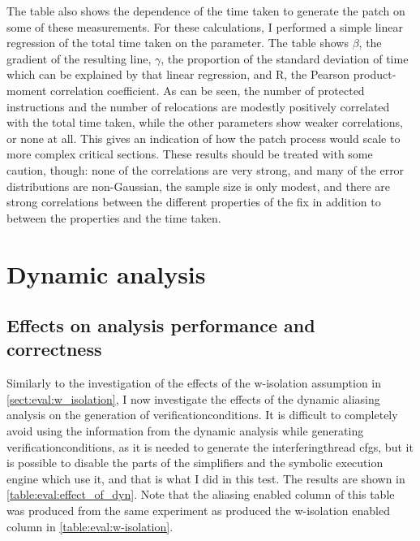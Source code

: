 The table also shows the dependence of the time taken to generate the
patch on some of these measurements.  For these calculations, I
performed a simple linear regression of the total time taken on the
parameter.  The table shows $\beta$, the gradient of the resulting
line, $\gamma$, the proportion of the standard deviation of time which
can be explained by that linear regression, and R, the Pearson
product-moment correlation coefficient.  As can be seen, the number of
protected instructions and the number of relocations are modestly
positively correlated with the total time taken, while the other
parameters show weaker correlations, or none at all.  This gives an
indication of how the patch process would scale to more complex
critical sections.  These results should be treated with some caution,
though: none of the correlations are very strong, and many of the
error distributions are non-Gaussian, the sample size is only modest,
and there are strong correlations between the different properties of
the fix in addition to between the properties and the time taken.

\section{Dynamic analysis}
\label{sect:eval:dynamic_analysis}

\subsection{Effects on analysis performance and correctness}


Similarly to the investigation of the effects of the \gls{w-isolation}
assumption in \autoref{sect:eval:w_isolation}, I now investigate the
effects of the dynamic aliasing analysis on the generation of
\glspl{verificationcondition}.  It is difficult to
completely avoid using the information from the dynamic analysis while
generating \glspl{verificationcondition}, as it is needed to generate
the \gls{interferingthread} \glspl{cfg}, but it is possible to disable
the parts of the {\StateMachine} simplifiers and the symbolic
execution engine which use it, and that is what I did in this test.
The results are shown in \autoref{table:eval:effect_of_dyn}.  Note
that the aliasing enabled column of this table was produced from the
same experiment as produced the \gls{w-isolation} enabled column in
\autoref{table:eval:w-isolation}.

